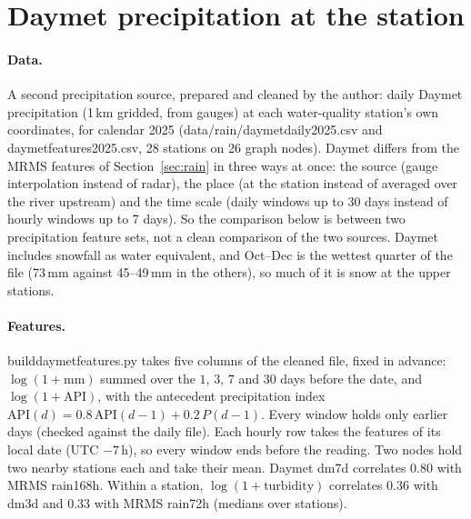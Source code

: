\documentclass[11pt]{article}
\newcommand{\codeus}{\textunderscore\allowbreak}
\newcommand{\code}[1]{{\ttfamily\let\_\codeus #1}}
\begin{document}
\section{Daymet precipitation at the station}\label{sec:daymet}

\paragraph{Data.} A second precipitation source, prepared and cleaned by the author: daily Daymet
precipitation (1\,km gridded, from gauges) at each water-quality station's own coordinates, for
calendar 2025 (\code{data/rain/daymet\_daily\_2025.csv} and \code{daymet\_features\_2025.csv}, 28
stations on 26 graph nodes). Daymet differs from the MRMS features of Section~\ref{sec:rain} in three
ways at once: the source (gauge interpolation instead of radar), the place (at the station instead of
averaged over the river upstream) and the time scale (daily windows up to 30 days instead of hourly
windows up to 7 days). So the comparison below is between two precipitation feature sets, not a clean
comparison of the two sources. Daymet includes snowfall as water equivalent, and Oct--Dec is the
wettest quarter of the file (73\,mm against 45--49\,mm in the others), so much of it is snow at the
upper stations.

\paragraph{Features.} \code{build\_daymet\_features.py} takes five columns of the cleaned file, fixed
in advance: $\log(1+\text{mm})$ summed over the $1$, $3$, $7$ and $30$ days before the date, and
$\log(1+\mathrm{API})$, with the antecedent precipitation index
$\mathrm{API}(d)=0.8\,\mathrm{API}(d-1)+0.2\,P(d-1)$. Every window holds only earlier days (checked
against the daily file). Each hourly row takes the features of its local date (UTC $-7$\,h), so
every window ends before the reading. Two nodes hold two nearby stations each and take their mean.
Daymet \code{dm\_7d} correlates $0.80$ with MRMS \code{rain\_168h}. Within a station, $\log(1+\text{turbidity})$
correlates $0.36$ with \code{dm\_3d} and $0.33$ with MRMS \code{rain\_72h} (medians over stations).
\end{document}

